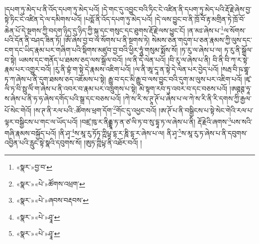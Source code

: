 །དཔག་ཏུ་མེད་པ་ནི་འོད་དཔག་ཏུ་མེད་པའོ། །དེ་གང་དུ་འབྱུང་བའི་ཏིང་ངེ་འཛིན་ནི་དཔག་ཏུ་མེད་པའི་རྡོ་རྗེ་ཞེས་བྱ་སྟེ་ཏིང་ངེ་འཛིན་དེ་ལ་དམིགས་པའོ། །པདྨོ་ནི་འོད་དཔག་ཏུ་མེད་པའོ། །དེ་ལས་བྱུང་བ་ནི་ཁྲོ་བོ་རྟ་མགྲིན་ཏེ་ཁྲོ་བོ་ཆེན་པོ་དེ་སྔགས་ཀྱི་བདག་ཉིད་དུ་ཉིད་ཀྱི་སྐུ་དང་གསུང་དང་ཐུགས་རྡོ་རྗེ་ལས་ཕྱུང་ངོ། །ན་མཿ་ཞེས་པ་\footnote{«སྣར་»བྱ་བ་}ལ་སོགས་པའི་དོན་ནི་བཤད་ཟིན་ཏོ། །ཨོཾ་ཞེས་བྱ་བ་ལ་སོགས་པ་ནི་སྔགས་ཏེ། སེམས་ཅན་གདུག་པ་ཅན་རྣམས་ཀྱི་ལུས་དང་ངག་དང་ཡིད་རྣམ་པར་གཞིག་པའི་སྡིགས་མཛུབ་བྱ་བའི་ཕྱིར་ཧཱུཾ་གསུམ་སྨོས་སོ། །ཏ་རུ་ལ་ཞེས་པ་ལ། ཏ་རུ་ནི་སྒྲོལ་བ་སྟེ། ཡམས་དང་གནོད་པ་ཐམས་ཅད་ལས་སྒྲོལ་བའོ། །ལ་ནི་དེ་ལེན་པའོ། །བི་རུ་ལ་ཞེས་པ་ནི། བི་ནི་བི་ཀ་ར་སྟེ་རྣམ་པར་འགྱུར་བའོ། །རུ་ནི་བྷཾ་ག་སྟེ་དེ་རྣམས་འཇིག་པའོ། །ལ་ནི་ཨཱ་དཱ་ན་སྟེ་དེ་ལེན་པར་བྱེད་པའོ། །སརྦ་བི་ཥ་གྷཱ་ཏ་ཀ་ཞེས་པ་ནི་དུག་ཐམས་ཅད་འཇོམས་པ་སྟེ། རྒྱུ་བ་དང་མི་རྒྱུ་བ་ལས་བྱུང་བའི་དུག་མ་ལུས་པར་འཇིག་པའོ། །ཛྭ་ལི་ཏ་བི་སྥུ་ལིཾ་ག་ཞེས་པ་ནི་འབར་བ་རྣམ་པར་འཁྲུགས་པ་སྟེ། མེ་སྟག་རབ་ཏུ་འབར་བ་དང་བཅས་པའོ། །ཨཊྚཊྚ་ཧཱ་ས་ཞེས་པ་ནི་ཧ་ཧ་ཞེས་དགོད་པའི་སྒྲ་དང་བཅས་པའོ། །ཀེ་ས་རི་ས་ཊཱ་ཊོ་པ་ཞེས་པ་ལ་ཀེ་ས་རི་ནི་རི་དགས་ཀྱི་རྒྱལ་པོ་སེང་གེའོ། །ས་ཊ་ནི་རལ་པའི་:ཚོགས་ཕྲག་དོག་\footnote{«སྣར་»«པེ་»ཚོགས་འཕྲག་}གོང་དུ་འཕྱང་བའོ། །ཨ་ཊོ་པ་ནི་བསྒྱིངས་པ་སྟེ་སེང་གེའི་རལ་པ་ལྟར་བསྒྱིངས་པ་གང་ལ་ཡོད་པའོ། །བཛྲ་ཁུ་ར་ནིརྒྷཱ་ཏ་ན་ཙ་ལི་ཏ་བ་སུ་དྷཱ་ཏ་ལ་ཞེས་པ་ནི། རྡོ་རྗེའི་ཞགས་\footnote{«སྣར་»«པེ་»ཞབས་བརྡབས་}པས་སའི་གཞི་རྣམས་བསྐྱོད་པའོ། །ནི་ཤྭ་\footnote{«སྣར་»«པེ་»ཤྭཱ་}ས་མཱ་རུ་ཏོཏ་ཀྵིཔྟ་དྷ་ར་ཎཱི་དྷ་ར་ཞེས་པ་ལ། ནི་ཤྭ་\footnote{«སྣར་»«པེ་»ཤྭཱ་}ས་མཱ་རུ་ཏ་ཞེས་པ་ནི་དབུགས་འབྱིན་པའི་རླུང་སྟེ་སྣའི་དབུགས་སོ། །ཨུཏ་ཀྵིཔྟ་ནི་འཐོར་བའོ། །
